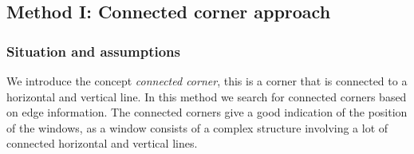 







% 



\subsection{Method I: Connected corner approach} 
\subsubsection{Situation and assumptions}
We introduce the concept \emph{connected corner}, this is a corner that is 
connected to a horizontal and vertical line.  
In this method we search for connected corners based on edge information.
The connected corners give a good indication of the position of the windows, as 
a window consists of a complex structure involving a lot of connected horizontal
and vertical lines. 


